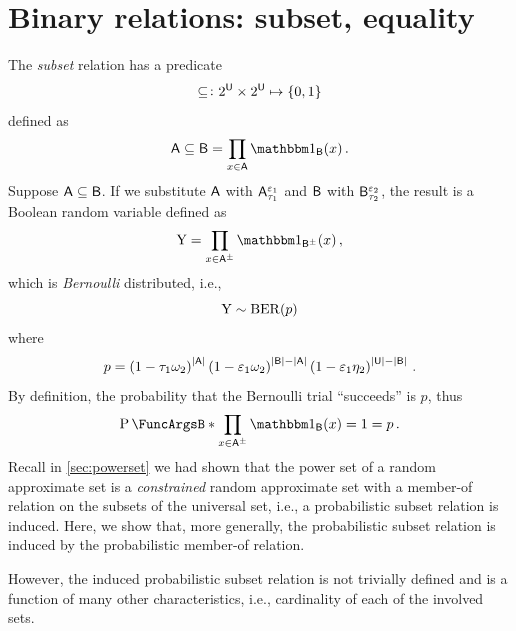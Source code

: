\documentclass[11pt,final,hidelinks]{article}
\begin{document}
\newcommand{\tsr}{\gamma}

\section{Binary relations: subset, equality}
The \emph{subset} relation has a predicate
\begin{equation}
	\subseteq \colon \PS{\Set{U}} \times \PS{\Set{U}} \mapsto \{0,1\}
\end{equation}
defined as
\begin{equation}
	\Set{A} \subseteq \Set{B} = \prod_{x \in \Set{A}} 
	\SetIndicator{\Set{B}}(x)\,.
\end{equation}
Suppose $\Set{A} \subseteq \Set{B}$.
If we substitute $\Set{A}$ with $\ASet{A}[\tprate_1][\fprate_1]$ and $\Set{B}$ with $\ASet{B}[\tprate_2][\fprate_2]$, the result is a Boolean random variable defined as
\begin{equation}
	\RV{Y} = \prod_{x \in \ASet{A}} \SetIndicator{\ASet{B}}(x)\,,
\end{equation}
which is \emph{Bernoulli} distributed, i.e.,
\begin{equation}
	\mathrm{Y} \sim \mathrm{BER}(p)
\end{equation}
where
\begin{equation}
	p = \left(1 - \tprate_1 \fnrate_2 \right)^{\Card{\Set{A}}}
\left(1 - \fprate_1\fnrate_2\right)^{\Card{\Set{B}} - \Card{\Set{A}}}
\left(1 - \fprate_1 \tnrate_2\right)^{\Card{\Set{U}} - 
	\Card{\Set{B}}}\,.
\end{equation}
By definition, the probability that the Bernoulli trial ``succeeds'' is $p$, thus
\begin{equation}
	\Prob{\prod_{x \in \ASet{A}} \SetIndicator{\Set{B}}(x) = 1} = p\,.
\end{equation}
Recall in \cref{sec:powerset} we had shown that the power set of a random approximate set is a \emph{constrained} random approximate set with a member-of relation on the subsets of the universal set, i.e., a probabilistic subset relation is induced.
Here, we show that, more generally, the probabilistic subset relation is induced by the probabilistic member-of relation.

However, the induced probabilistic subset relation is not trivially defined and is a function of many other characteristics, i.e., cardinality of each of the involved sets.
\end{document}
